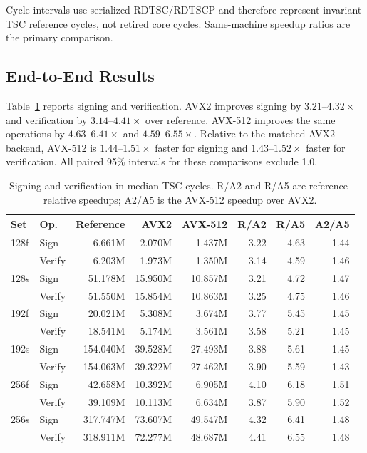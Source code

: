 Cycle intervals use serialized RDTSC/RDTSCP and therefore represent invariant
TSC reference cycles, not retired core cycles.  Same-machine speedup ratios are
the primary comparison.

\subsection{End-to-End Results}

Table~\ref{tab:signverify} reports signing and verification.  AVX2 improves
signing by $3.21$--$4.32\times$ and verification by $3.14$--$4.41\times$ over
reference.  AVX-512 improves the same operations by $4.63$--$6.41\times$ and
$4.59$--$6.55\times$.  Relative to the matched AVX2 backend, AVX-512 is
$1.44$--$1.51\times$ faster for signing and $1.43$--$1.52\times$ faster for
verification.  All paired 95\% intervals for these comparisons exclude 1.0.

\begin{table}[t]
\centering
\caption{Signing and verification in median TSC cycles.  R/A2 and R/A5 are
reference-relative speedups; A2/A5 is the AVX-512 speedup over AVX2.}
\label{tab:signverify}
\scriptsize
\setlength{\tabcolsep}{3.5pt}
\begin{tabular}{llrrrrrr}
\toprule
Set & Op. & Reference & AVX2 & AVX-512 & R/A2 & R/A5 & A2/A5\\
\midrule
128f & Sign   & 6.661M & 2.070M & 1.437M & 3.22 & 4.63 & 1.44\\
     & Verify & 6.203M & 1.973M & 1.350M & 3.14 & 4.59 & 1.46\\
128s & Sign   & 51.178M & 15.950M & 10.857M & 3.21 & 4.72 & 1.47\\
     & Verify & 51.550M & 15.854M & 10.863M & 3.25 & 4.75 & 1.46\\
192f & Sign   & 20.021M & 5.308M & 3.674M & 3.77 & 5.45 & 1.45\\
     & Verify & 18.541M & 5.174M & 3.561M & 3.58 & 5.21 & 1.45\\
192s & Sign   & 154.040M & 39.528M & 27.493M & 3.88 & 5.61 & 1.45\\
     & Verify & 154.063M & 39.322M & 27.462M & 3.90 & 5.59 & 1.43\\
256f & Sign   & 42.658M & 10.392M & 6.905M & 4.10 & 6.18 & 1.51\\
     & Verify & 39.109M & 10.113M & 6.634M & 3.87 & 5.90 & 1.52\\
256s & Sign   & 317.747M & 73.607M & 49.547M & 4.32 & 6.41 & 1.48\\
     & Verify & 318.911M & 72.277M & 48.687M & 4.41 & 6.55 & 1.48\\
\bottomrule
\end{tabular}
\end{table}

